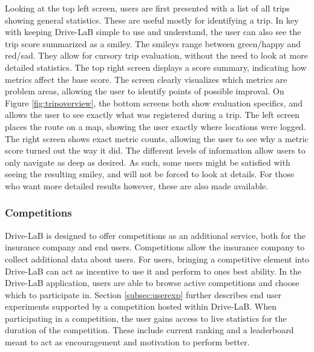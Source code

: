 Looking at the top left screen, users are first presented with a list of all trips showing general statistics. These are useful mostly for identifying a trip. In key with keeping Drive-LaB simple to use and understand, the user can also see the trip score summarized as a smiley. The smileys range between green/happy and red/sad. They allow for cursory trip evaluation, without the need to look at more detailed statistics.
The top right screen displays a score summary, indicating how metrics affect the base score. The screen clearly visualizes which metrics are problem areas, allowing the user to identify points of possible improval.
On Figure \ref{fig:tripoverview}, the bottom screens both show evaluation specifics, and allows the user to see exactly what was registered during a trip. The left screen places the route on a map, showing the user exactly where locations were logged. The right screen shows exact metric counts, allowing the user to see why a metric score turned out the way it did.
The different levels of information allow users to only navigate as deep as desired. As such, some users might be satisfied with seeing the resulting smiley, and will not be forced to look at details. For those who want more detailed results however, these are also made available.

\subsubsection{Competitions} \label{subsubsec:competitions}
Drive-LaB is designed to offer competitions as an additional service, both for the insurance company and end users. Competitions allow the insurance company to collect additional data about users. For users, bringing a competitive element into Drive-LaB can act as incentive to use it and perform to ones best ability. In the Drive-LaB application, users are able to browse active competitions and choose which to participate in. Section \ref{subsec:userexp} further describes end user experiments supported by a competition hosted within Drive-LaB. When participating in a competition, the user gains access to live statistics for the duration of the competition. These include current ranking and a leaderboard meant to act as encouragement and motivation to perform better.